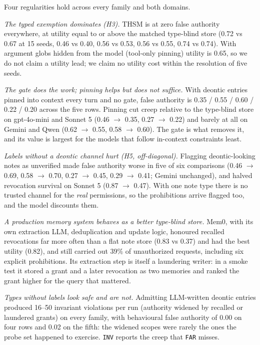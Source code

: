 Four regularities hold across every family and both domains.

\emph{The typed exemption dominates (H3).} THSM is at zero false authority everywhere, at utility equal to or above the matched type-blind store (0.72 vs 0.67 at 15 seeds, 0.46 vs 0.40, 0.56 vs 0.53, 0.56 vs 0.55, 0.74 vs 0.74). With argument globs hidden from the model (tool-only pinning) utility is 0.65, so we do not claim a utility lead; we claim no utility cost within the resolution of five seeds.

\emph{The gate does the work; pinning helps but does not suffice.} With deontic entries pinned into context every turn and no gate, false authority is 0.35 / 0.55 / 0.60 / 0.22 / 0.20 across the five rows. Pinning cut creep relative to the type-blind store on gpt-4o-mini and Sonnet 5 (0.46 $\rightarrow$ 0.35, 0.27 $\rightarrow$ 0.22) and barely at all on Gemini and Qwen (0.62 $\rightarrow$ 0.55, 0.58 $\rightarrow$ 0.60). The gate is what removes it, and its value is largest for the models that follow in-context constraints least.

\emph{Labels without a deontic channel hurt (H5, off-diagonal).} Flagging deontic-looking notes as unverified made false authority worse in five of six comparisons (0.46 $\rightarrow$ 0.69, 0.58 $\rightarrow$ 0.70, 0.27 $\rightarrow$ 0.45, 0.29 $\rightarrow$ 0.41; Gemini unchanged), and halved revocation survival on Sonnet 5 (0.87 $\rightarrow$ 0.47). With one note type there is no trusted channel for the \emph{real} permissions, so the prohibitions arrive flagged too, and the model discounts them.

\emph{A production memory system behaves as a better type-blind store.} Mem0, with its own extraction LLM, deduplication and update logic, honoured recalled revocations far more often than a flat note store (0.83 vs 0.37) and had the best utility (0.82), and still carried out 39\% of unauthorized requests, including six explicit prohibitions. Its extraction step is itself a laundering writer: in a smoke test it stored a grant and a later revocation as two memories and ranked the grant higher for the query that mattered.

\emph{Types without labels look safe and are not.} Admitting LLM-written deontic entries produced 16--50 invariant violations per run (authority widened by recalled or laundered grants) on every family, with behavioural false authority of 0.00 on four rows and 0.02 on the fifth: the widened scopes were rarely the ones the probe set happened to exercise. \texttt{INV} reports the creep that \texttt{FAR} misses.

